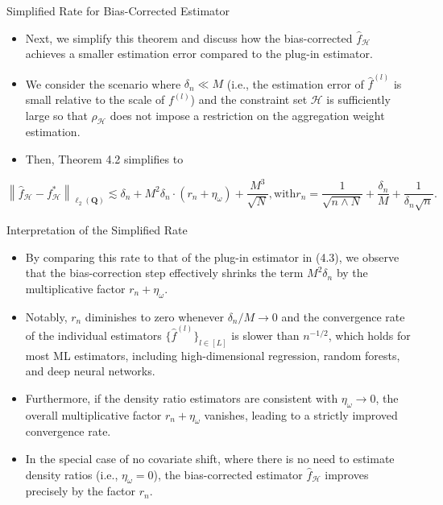 \documentclass{beamer}
\begin{document}
\begin{frame}{Simplified Rate for Bias-Corrected Estimator}
    \begin{itemize}
        \item Next, we simplify this theorem and discuss how the bias-corrected $\widehat{f}_{\mathcal{H}}$ achieves a smaller estimation error compared to the plug-in estimator.
        \item We consider the scenario where $\delta_{n} \ll M$ (i.e., the estimation error of ${\widehat{f}}^{(l)}$ is small relative to the scale of $f^{(l)}$) and the constraint set $\mathcal{H}$ is sufficiently large so that $\rho_{\mathcal{H}}$ does not impose a restriction on the aggregation weight estimation.
        \item Then, Theorem 4.2 simplifies to
    \end{itemize}
    \begin{equation*}
        \left\| \widehat{f} _{\mathcal{H}} - f _{\mathcal{H}} ^{*} \right\| _{\ell_{2} (\mathbf{Q})} \lesssim \delta_{n} + M ^{2} \delta_{n} \cdot (r _{n} + \eta_{\omega}) + \frac {M ^{3}}{\sqrt {N}}, \mathrm{with} r _{n} = \frac {1}{\sqrt {n \wedge N}} + \frac {\delta_{n}}{M} + \frac {1}{\delta_{n} \sqrt {n}}.
    \end{equation*}
\end{frame}

\begin{frame}{Interpretation of the Simplified Rate}
    \begin{itemize}
        \item By comparing this rate to that of the plug-in estimator in (4.3), we observe that the bias-correction step effectively shrinks the term $M^{2} \delta_{n}$ by the multiplicative factor $r_{n} + \eta_{\omega}$.
        \item Notably, $r_{n}$ diminishes to zero whenever $\delta_{n} / M \to 0$ and the convergence rate of the individual estimators $\{ \widehat{f}^{(l)} \}_{l \in [L]}$ is slower than $n^{-1/2}$, which holds for most ML estimators, including high-dimensional regression, random forests, and deep neural networks.
        \item Furthermore, if the density ratio estimators are consistent with $\eta_{\omega} \to 0$, the overall multiplicative factor $r_{n} + \eta_{\omega}$ vanishes, leading to a strictly improved convergence rate.
        \item In the special case of no covariate shift, where there is no need to estimate density ratios (i.e., $\eta_{\omega} = 0$), the bias-corrected estimator $\widehat{f}_{\mathcal{H}}$ improves precisely by the factor $r_{n}$.
    \end{itemize}
\end{frame}
\end{document}

